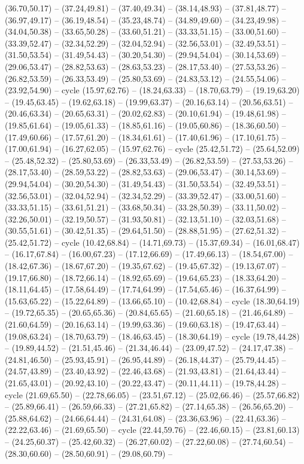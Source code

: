 {(36.70,50.17) -- (37.24,49.81) -- (37.40,49.34) -- (38.14,48.93) -- (37.81,48.77) -- (36.97,49.17) -- (36.19,48.54) -- (35.23,48.74) -- (34.89,49.60) -- (34.23,49.98) -- (34.04,50.38) -- (33.65,50.28) -- (33.60,51.21) -- (33.33,51.15) -- (33.00,51.60) -- (33.39,52.47) -- (32.34,52.29) -- (32.04,52.94) -- (32.56,53.01) -- (32.49,53.51) -- (31.50,53.54) -- (31.49,54.43) -- (30.20,54.30) -- (29.94,54.04) -- (30.14,53.69) -- (29.06,53.47) -- (28.82,53.63) -- (28.63,53.23) -- (28.17,53.40) -- (27.53,53.26) -- (26.82,53.59) -- (26.33,53.49) -- (25.80,53.69) -- (24.83,53.12) -- (24.55,54.06) -- (23.92,54.90) -- cycle (15.97,62.76) -- (18.24,63.33) -- (18.70,63.79) -- (19.19,63.20) -- (19.45,63.45) -- (19.62,63.18) -- (19.99,63.37) -- (20.16,63.14) -- (20.56,63.51) -- (20.46,63.34) -- (20.65,63.31) -- (20.02,62.83) -- (20.10,61.94) -- (19.48,61.98) -- (19.85,61.64) -- (19.05,61.33) -- (18.85,61.16) -- (19.05,60.86) -- (18.36,60.50) -- (17.49,60.66) -- (17.57,61.20) -- (18.34,61.61) -- (17.40,61.96) -- (17.10,61.75) -- (17.00,61.94) -- (16.27,62.05) -- (15.97,62.76) -- cycle (25.42,51.72) -- (25.64,52.09) -- (25.48,52.32) -- (25.80,53.69) -- (26.33,53.49) -- (26.82,53.59) -- (27.53,53.26) -- (28.17,53.40) -- (28.59,53.22) -- (28.82,53.63) -- (29.06,53.47) -- (30.14,53.69) -- (29.94,54.04) -- (30.20,54.30) -- (31.49,54.43) -- (31.50,53.54) -- (32.49,53.51) -- (32.56,53.01) -- (32.04,52.94) -- (32.34,52.29) -- (33.39,52.47) -- (33.00,51.60) -- (33.33,51.15) -- (33.61,51.21) -- (33.68,50.34) -- (33.28,50.39) -- (33.11,50.02) -- (32.26,50.01) -- (32.19,50.57) -- (31.93,50.81) -- (32.13,51.10) -- (32.03,51.68) -- (30.55,51.61) -- (30.42,51.35) -- (29.64,51.50) -- (28.88,51.95) -- (27.62,51.32) -- (25.42,51.72) -- cycle (10.42,68.84) -- (14.71,69.73) -- (15.37,69.34) -- (16.01,68.47) -- (16.17,67.84) -- (16.00,67.23) -- (17.12,66.69) -- (17.49,66.13) -- (18.54,67.00) -- (18.42,67.36) -- (18.67,67.20) -- (19.35,67.62) -- (19.45,67.32) -- (19.13,67.07) -- (19.17,66.80) -- (18.72,66.14) -- (18.92,65.69) -- (19.64,65.23) -- (18.33,64.20) -- (18.11,64.45) -- (17.58,64.49) -- (17.74,64.99) -- (17.54,65.46) -- (16.37,64.99) -- (15.63,65.22) -- (15.22,64.89) -- (13.66,65.10) -- (10.42,68.84) -- cycle (18.30,64.19) -- (19.72,65.35) -- (20.65,65.36) -- (20.84,65.65) -- (21.60,65.18) -- (21.46,64.89) -- (21.60,64.59) -- (20.16,63.14) -- (19.99,63.36) -- (19.60,63.18) -- (19.47,63.44) -- (19.08,63.24) -- (18.70,63.79) -- (18.46,63.45) -- (18.30,64.19) -- cycle (19.78,44.28) -- (19.89,44.52) -- (21.51,45.46) -- (21.34,46.44) -- (23.09,47.52) -- (24.17,47.38) -- (24.81,46.50) -- (25.93,45.91) -- (26.95,44.89) -- (26.18,44.37) -- (25.79,44.45) -- (24.57,43.89) -- (23.40,43.92) -- (22.46,43.68) -- (21.93,43.81) -- (21.64,43.44) -- (21.65,43.01) -- (20.92,43.10) -- (20.22,43.47) -- (20.11,44.11) -- (19.78,44.28) -- cycle (21.69,65.50) -- (22.78,66.05) -- (23.51,67.12) -- (25.02,66.46) -- (25.57,66.82) -- (25.89,66.41) -- (26.59,66.33) -- (27.21,65.82) -- (27.14,65.38) -- (26.56,65.20) -- (25.88,64.62) -- (24.66,64.44) -- (24.31,64.08) -- (23.36,63.96) -- (22.41,63.36) -- (22.22,63.46) -- (21.69,65.50) -- cycle (22.44,59.76) -- (22.46,60.15) -- (23.81,60.13) -- (24.25,60.37) -- (25.42,60.32) -- (26.27,60.02) -- (27.22,60.08) -- (27.74,60.54) -- (28.30,60.60) -- (28.50,60.91) -- (29.08,60.79) -- }
